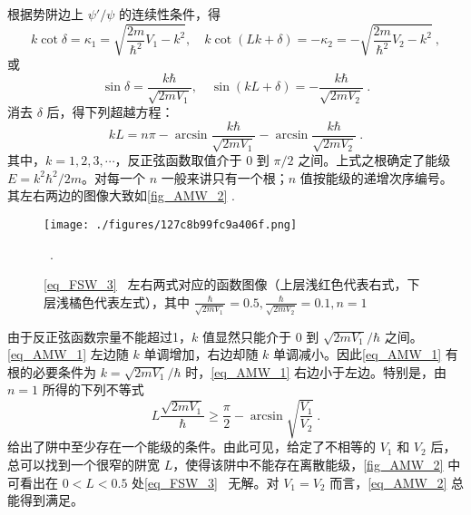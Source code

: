 根据势阱边上 $\psi'/\psi$ 的连续性条件，得
\begin{equation}
k\cot\delta=\kappa_1=\sqrt{\frac{2m}{\hbar^2}V_1-k^2},\quad k\cot(Lk+\delta)=-\kappa_2=-\sqrt{\frac{2m}{\hbar^2}V_2-k^2}~,
\end{equation}
或
\begin{equation}
\sin\delta=\frac{k\hbar}{\sqrt{2mV_1}},\quad\sin(kL+\delta)=-\frac{k\hbar}{\sqrt{2mV_2}}~.
\end{equation}
消去 $\delta$ 后，得下列超越方程：
\begin{equation}\label{eq_AMW_1}
kL=n\pi-\arcsin\frac{k\hbar}{\sqrt{2mV_1}}-\arcsin\frac{k\hbar}{\sqrt{2mV_2}}~.
\end{equation}
其中，$k=1,2,3,\cdots$，反正弦函数取值介于 $0$ 到 $\pi/2$ 之间。上式之根确定了能级 $E=k^2\hbar^2/2m$。对每一个 $n$ 一般来讲只有一个根；$n$ 值按能级的递增次序编号。其左右两边的图像大致如\autoref{fig_AMW_2} .
\begin{figure}[ht]
\centering
\texttt{[image: ./figures/127c8b99fc9a406f.png]}
\caption{\autoref{eq_FSW_3}~ 左右两式对应的函数图像（上层浅红色代表右式，下层浅橘色代表左式），其中 $\frac{\hbar}{\sqrt{2mV_1}}=0.5,\frac{\hbar}{\sqrt{2mV_2}}=0.1,n=1$} \label{fig_AMW_2}~.
\end{figure}
由于反正弦函数宗量不能超过1，$k$ 值显然只能介于 $0$ 到 $\sqrt{2mV_1}/\hbar$ 之间。\autoref{eq_AMW_1} 左边随 $k$ 单调增加，右边却随 $k$ 单调减小。因此\autoref{eq_AMW_1} 有根的必要条件为 $k=\sqrt{2mV_1}/\hbar$ 时，\autoref{eq_AMW_1} 右边小于左边。特别是，由 $n=1$ 所得的下列不等式
\begin{equation}\label{eq_AMW_2}
L\frac{\sqrt{2mV_1}}{\hbar}\geq\frac{\pi}{2}-\arcsin\sqrt{\frac{V_1}{V_2}}~.
\end{equation}
给出了阱中至少存在一个能级的条件。由此可见，给定了不相等的 $V_1$ 和 $V_2$ 后，总可以找到一个很窄的阱宽 $L$，使得该阱中不能存在离散能级，\autoref{fig_AMW_2} 中可看出在 $0<L<0.5$ 处\autoref{eq_FSW_3}~ 无解。对 $V_1=V_2$ 而言，\autoref{eq_AMW_2} 总能得到满足。
